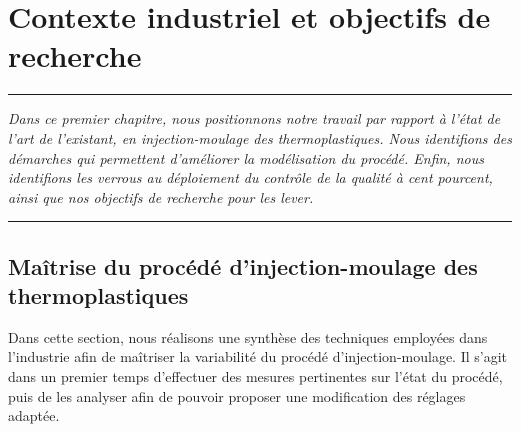 
\lhead[\fancyplain{}{\leftmark}]%
      {\fancyplain{}{}} %
\chead[\fancyplain{}{}]%
      {\fancyplain{}{}}
\rhead[\fancyplain{}{}]%
      {\fancyplain{}{\rightmark}}%
\lfoot[\fancyplain{}{}]%
      {\fancyplain{}{}}
\cfoot[\fancyplain{}{\thepage}]%
      {\fancyplain{}{\thepage}} %
\rfoot[\fancyplain{}{}]%
     {\fancyplain{}{\scriptsize}}



\chapter{Contexte industriel et objectifs de recherche}
\label{ch:objectives}


\begin{center}
\rule{0.7\linewidth}{.5pt}
\begin{minipage}{0.7\linewidth}
\smallskip

\textit{Dans ce premier chapitre, nous positionnons notre travail par rapport à l'état de l'art de l'existant, en injection-moulage des thermoplastiques. Nous identifions des démarches qui permettent d'améliorer la modélisation du procédé. Enfin, nous identifions les verrous au déploiement du contrôle de la qualité à cent pourcent, ainsi que nos objectifs de recherche pour les lever.
}

\end{minipage}
\smallskip
\rule{0.7\linewidth}{.5pt}
\end{center}

\minitoc
\newpage

\FloatBarrier
\section{Maîtrise du procédé d'injection-moulage des thermoplastiques}
Dans cette section, nous réalisons une synthèse des techniques employées dans l'industrie afin de maîtriser la variabilité du procédé d'injection-moulage.
Il s'agit dans un premier temps d'effectuer des mesures pertinentes sur l'état du procédé, puis de les analyser afin de pouvoir proposer une modification des réglages adaptée.

